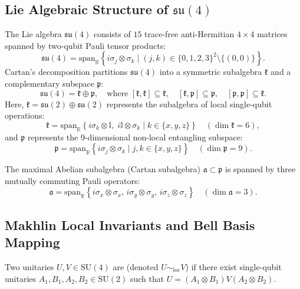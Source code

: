 \subsection{Lie Algebraic Structure of $\mathfrak{su}(4)$}
The Lie algebra $\mathfrak{su}(4)$ consists of $15$ trace-free anti-Hermitian $4 \times 4$ matrices spanned by two-qubit Pauli tensor products:
\begin{equation}
    \mathfrak{su}(4) = \text{span}_{\mathbb{R}} \left\{ i \sigma_j \otimes \sigma_k \mid (j, k) \in \{0, 1, 2, 3\}^2 \setminus \{(0, 0)\} \right\}.
\end{equation}
Cartan's decomposition partitions $\mathfrak{su}(4)$ into a symmetric subalgebra $\mathfrak{k}$ and a complementary subspace $\mathfrak{p}$:
\begin{equation}
    \mathfrak{su}(4) = \mathfrak{k} \oplus \mathfrak{p}, \quad \text{where } [\mathfrak{k}, \mathfrak{k}] \subseteq \mathfrak{k}, \quad [\mathfrak{k}, \mathfrak{p}] \subseteq \mathfrak{p}, \quad [\mathfrak{p}, \mathfrak{p}] \subseteq \mathfrak{k}.
    \label{eq:cartan_inv_subspaces}
\end{equation}
Here, $\mathfrak{k} = \mathfrak{su}(2) \oplus \mathfrak{su}(2)$ represents the subalgebra of local single-qubit operations:
\begin{equation}
    \mathfrak{k} = \text{span}_{\mathbb{R}} \left\{ i \sigma_k \otimes \mathbb{I}, \; i \mathbb{I} \otimes \sigma_k \mid k \in \{x, y, z\} \right\} \quad (\dim \mathfrak{k} = 6),
\end{equation}
and $\mathfrak{p}$ represents the 9-dimensional non-local entangling subspace:
\begin{equation}
    \mathfrak{p} = \text{span}_{\mathbb{R}} \left\{ i \sigma_j \otimes \sigma_k \mid j, k \in \{x, y, z\} \right\} \quad (\dim \mathfrak{p} = 9).
\end{equation}

The maximal Abelian subalgebra (Cartan subalgebra) $\mathfrak{a} \subset \mathfrak{p}$ is spanned by three mutually commuting Pauli operators:
\begin{equation}
    \mathfrak{a} = \text{span}_{\mathbb{R}} \left\{ i \sigma_x \otimes \sigma_x, \, i \sigma_y \otimes \sigma_y, \, i \sigma_z \otimes \sigma_z \right\} \quad (\dim \mathfrak{a} = 3).
\end{equation}

\subsection{Makhlin Local Invariants and Bell Basis Mapping}
Two unitaries $U, V \in \text{SU}(4)$ are  (denoted $U \sim_{\text{loc}} V$) if there exist single-qubit unitaries $A_1, B_1, A_2, B_2 \in \text{SU}(2)$ such that $U = (A_1 \otimes B_1) V (A_2 \otimes B_2)$. 

